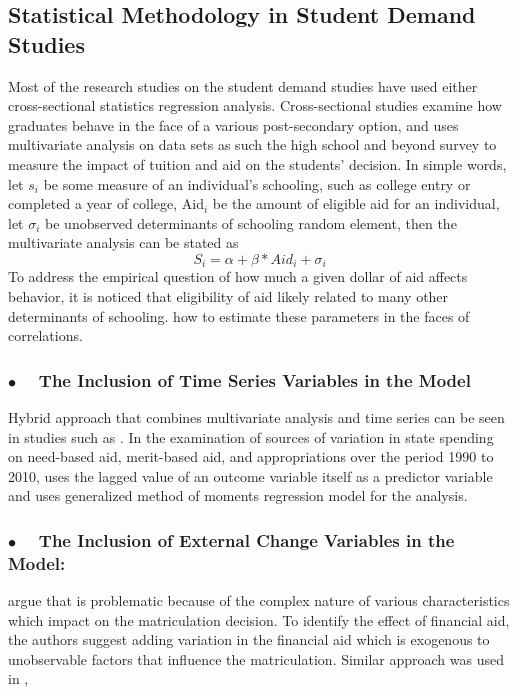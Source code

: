 \documentclass[12pt,english]{report}
\begin{document}
\subsection{Statistical Methodology in Student Demand Studies}
Most of the research studies on the student demand studies have used either
cross-sectional statistics regression analysis. 
Cross-sectional studies examine how graduates behave in the face of a various
post-secondary option, and uses multivariate analysis on data sets as such the
high school and beyond survey to measure the impact of tuition and aid on the
students' decision.   In simple words, let $s_i$ be some measure of an
individual's schooling, such as
college entry or completed a year of college, Aid$_i$ be the amount of eligible
aid for an individual,  let $\sigma_i$  be unobserved determinants of schooling
random element, then the multivariate analysis can
be stated as $$S_i = \alpha + \beta * Aid_i + \sigma_i$$
To address the empirical question of how much a given dollar of aid affects
behavior,  it is noticed that eligibility of aid likely related to many other
determinants of schooling.  \cite{Dynarski2002} how to estimate these
parameters in the faces of correlations.

\subsubsection{$\bullet \quad$  The Inclusion of Time Series Variables in the
Model}  Hybrid approach that combines multivariate analysis and time series can
be seen in studies such as \citet{Heller1999}. In the examination of sources of
variation in state spending on need-based aid, merit-based aid, and
appropriations over the period 1990 to 2010, \citep{McLendon2014} uses the
lagged value of an outcome variable itself as a predictor variable and uses
generalized method of moments regression model for the analysis.

\subsubsection{$\bullet \quad$  The Inclusion of External Change Variables in
the Model:} 

\citet{Dynarski2003} argue that  is
problematic because of the complex nature of various characteristics which
impact on the matriculation decision. To identify the effect of financial aid,
the authors suggest adding variation in the financial aid which is exogenous to
unobservable factors that influence the matriculation.  Similar approach was
used in \citep{Dynarski2003, Abraham2006},
\end{document}
